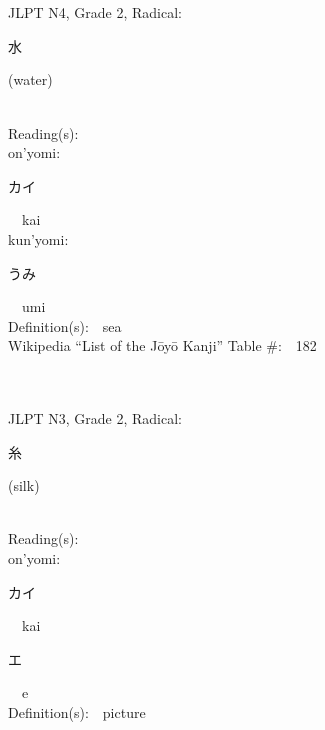 \begin{multicols}{2}
\ \ \\
{\fontsize{34pt}{40pt}  }\ \ \\  %
{JLPT N4, Grade 2, Radical:\ \ {\begin{CJK}{UTF8}{min} 水 \end{CJK}} (water) } \\
Reading(s):\ \ \\
{\hspace*{1em}}on'yomi:\ \ \\
{\hspace*{2em}}{\begin{CJK}{UTF8}{min} カイ \end{CJK}}\ \ kai\ \ \\
{\hspace*{1em}}kun'yomi:\ \ \\
{\hspace*{2em}}{\begin{CJK}{UTF8}{min} うみ \end{CJK}}\ \ umi\ \ \\
Definition(s):\ \ sea \\
Wikipedia ``List of the J\=oy\=o Kanji'' Table \#:\ \ 182 \\
\ \ \\
{\fontsize{34pt}{40pt}  }\ \ \\  %
{JLPT N3, Grade 2, Radical:\ \ {\begin{CJK}{UTF8}{min} 糸 \end{CJK}} (silk) } \\
Reading(s):\ \ \\
{\hspace*{1em}}on'yomi:\ \ \\
{\hspace*{2em}}{\begin{CJK}{UTF8}{min} カイ \end{CJK}}\ \ kai\ \ \\
{\hspace*{2em}}{\begin{CJK}{UTF8}{min} エ \end{CJK}}\ \ e\ \ \\
Definition(s):\ \ picture \\

\end{multicols}
